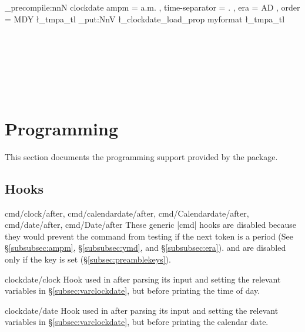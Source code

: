\documentclass{beerydoc}
\begin{document}
\begin{codedemo}
  \ExplSyntaxOn
  \keys_precompile:nnN { clockdate }
    {
        ampm = a.m.
      , time-separator = .
      , era = AD
      , order = MDY
    }
    \l_tmpa_tl
  \prop_put:NnV \l_clockdate_load_prop { myformat } \l_tmpa_tl
  \ExplSyntaxOff
  \\
  \\
  \\
  \\
  \\
  \\
  \\
\end{codedemo}


\section{Programming}
\label{sec:programming}

This section documents the programming support provided by the 
package.

\subsection{Hooks}
\label{subsec:hooks}

\begin{codedoc}
  {
    cmd/clock/after,
    cmd/calendardate/after,
    cmd/Calendardate/after,
    cmd/date/after,
    cmd/Date/after
  }
  These generic |cmd| hooks are disabled because they would prevent the command
  from testing if the next token is a period (See \S\ref{subsubsec:ampm},
  \S\ref{subsubsec:ymd}, and \S\ref{subsubsec:era}).
   and  are disabled only if the key
   is set (\S\ref{subsec:preamblekeys}).
\end{codedoc}

\begin{codedoc}{clockdate/clock}
  Hook used in  after parsing its input and setting the
  relevant variables in \S\ref{subsec:varclockdate}, but before printing the
  time of day.
\end{codedoc}

\begin{codedoc}{clockdate/date}
  Hook used in  after parsing its input and setting the
  relevant variables in \S\ref{subsec:varclockdate}, but before printing the
  calendar date.
\end{codedoc}
\end{document}
